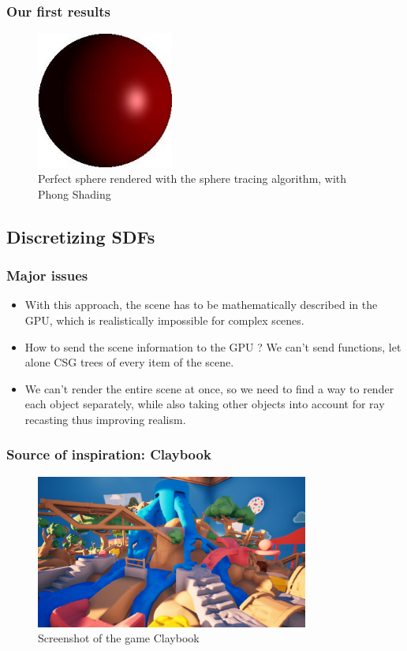 \documentclass[handout]{beamer}
\begin{document}
\begin{frame}
  \frametitle{Our first results}
  \begin{figure}
    \centering
    \includegraphics[width=0.4\textwidth]{figures/ray_marching_phong.JPG}
    \caption{Perfect sphere rendered with the sphere tracing algorithm, with Phong Shading}
    \label{fig:sphere-phong}
  \end{figure}
\end{frame}

\subsection{Discretizing SDFs}

\begin{frame}
  \frametitle{Major issues}

  \begin{itemize}
    \item With this approach, the scene has to be mathematically described in the GPU, which is realistically impossible for complex scenes.
    \item How to send the scene information to the GPU ? We can't send functions, let alone CSG trees of every item of the scene.
    \item We can't render the entire scene at once, so we need to find a way to render each object separately, while also taking other objects into account for ray recasting thus improving realism.
  \end{itemize} 
  
\end{frame}

\begin{frame}
  \frametitle{Source of inspiration: Claybook}
  \begin{figure}
    \centering
    \includegraphics[width=0.8\textwidth]{figures/claybook.jpg}
    \caption{Screenshot of the game Claybook}
    \label{fig:claybook}
  \end{figure}
\end{frame}
\end{document}
